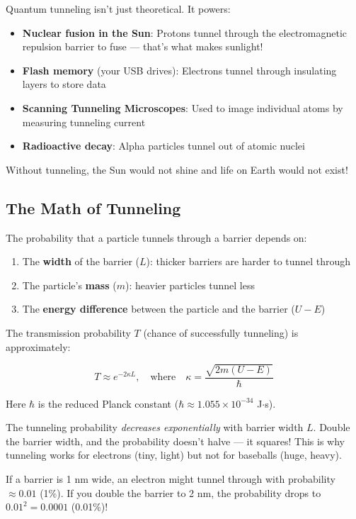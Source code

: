 \documentclass[11pt,a4paper]{article}
\begin{document}
\begin{tcolorbox}[colback=funpurple!10,colframe=funpurple,title=\textbf{Tunneling in Real Life}]
Quantum tunneling isn't just theoretical. It powers:
\begin{itemize}
    \item \textbf{Nuclear fusion in the Sun}: Protons tunnel through the electromagnetic repulsion barrier to fuse --- that's what makes sunlight!
    \item \textbf{Flash memory} (your USB drives): Electrons tunnel through insulating layers to store data
    \item \textbf{Scanning Tunneling Microscopes}: Used to image individual atoms by measuring tunneling current
    \item \textbf{Radioactive decay}: Alpha particles tunnel out of atomic nuclei
\end{itemize}
Without tunneling, the Sun would not shine and life on Earth would not exist!
\end{tcolorbox}

\subsection{The Math of Tunneling}

The probability that a particle tunnels through a barrier depends on:
\begin{enumerate}
    \item The \textbf{width} of the barrier ($L$): thicker barriers are harder to tunnel through
    \item The particle's \textbf{mass} ($m$): heavier particles tunnel less
    \item The \textbf{energy difference} between the particle and the barrier ($U - E$)
\end{enumerate}

The transmission probability $T$ (chance of successfully tunneling) is approximately:

\begin{equation}
T \approx e^{-2\kappa L}, \quad \text{where} \quad \kappa = \frac{\sqrt{2m(U-E)}}{\hbar}
\end{equation}

Here $\hbar$ is the reduced Planck constant ($\hbar \approx 1.055 \times 10^{-34}$ J$\cdot$s).

\begin{tcolorbox}[colback=energyred!10,colframe=energyred,title=\textbf{What This Equation Tells Us}]
The tunneling probability \textit{decreases exponentially} with barrier width $L$. Double the barrier width, and the probability doesn't halve --- it squares! This is why tunneling works for electrons (tiny, light) but not for baseballs (huge, heavy).

If a barrier is 1 nm wide, an electron might tunnel through with probability $\approx 0.01$ (1\%). If you double the barrier to 2 nm, the probability drops to $0.01^2 = 0.0001$ (0.01\%)!
\end{tcolorbox}
\end{document}
